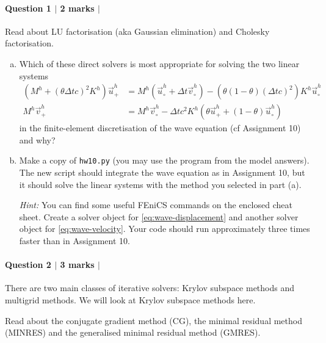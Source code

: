 \documentclass[10pt,letterpaper]{scrartcl}
\begin{document}
\paragraph*{Question 1 $\vert$ 2 marks $\vert$ \faFileCodeO{} \: \faFilePdfO}

Read about LU factorisation (aka Gaussian elimination) and Cholesky factorisation.
\begin{enumerate}[(a)]
\item Which of these direct solvers is most appropriate for solving the two linear systems
\begin{subequations}\label{eq:wave}
\begin{align}
\left(M^h + \left(\theta \Delta t c\right)^2 K^h\right) \vec{u}^h_+ &= M^h \left( \vec{u}^h_\circ + \Delta t \vec{v}^h_\circ\right) - \left( \theta\left(1-\theta\right) \left(\Delta t c\right)^2 \right)K^h \vec{u}^h_\circ\label{eq:wave-displacement}\\
M^h \vec{v}^h_+ &= M^h \vec{v}^h_\circ - \Delta t c^2 K^h \left( \theta \vec{u}^h_+ + \left(1-\theta\right) \vec{u}^h_\circ\right)\label{eq:wave-velocity}
\end{align}
\end{subequations}
in the finite-element discretisation of the wave equation (cf Assignment 10) and why?

\vfill

\item Make a copy of \texttt{hw10.py} (you may use the program from the model answers). The new script should integrate the wave equation as in Assignment 10, but it should solve the linear systems with the method you selected in part (a).

\emph{Hint:} You can find some useful \textsf{FEniCS} commands on the enclosed cheat sheet. Create a solver object for \eqref{eq:wave-displacement} and another solver object for \eqref{eq:wave-velocity}. Your code should run approximately three times faster than in Assignment 10.
\end{enumerate}

\paragraph*{Question 2 $\vert$ 3 marks $\vert$ \faFileCodeO{} \: \faFilePdfO}

There are two main classes of iterative solvers: Krylov subspace methods and multigrid methods. We will look at Krylov subspace methods here.

Read about the conjugate gradient method (CG), the minimal residual method (MINRES) and the generalised minimal residual method (GMRES).
\end{document}
